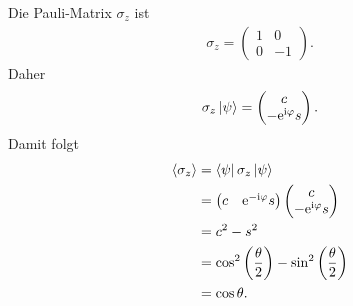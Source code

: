 \documentclass[11pt,a4paper]{scrartcl}
\newcommand{\e}{\mathrm e}
\newcommand{\ii}{\mathrm i}
\begin{document}
\begin{enumerate}[label=(\alph*)]
\begin{calculationbox}
            \begin{calculationbox}[title=Erwartungswert von $\sigma_z$]
                Die Pauli-Matrix $\sigma_z$ ist
                \begin{align*}
                    \sigma_z=
                    \begin{pmatrix}
                        1&0\\
                        0&-1
                    \end{pmatrix}.
                \end{align*}
                Daher
                \begin{align*}
                    \sigma_z\ket{\psi}
                    =
                    \begin{pmatrix}
                        c\\
                        -\e^{\ii\varphi}s
                    \end{pmatrix}.
                \end{align*}
                Damit folgt
                \begin{align*}
                    \braket{\sigma_z}
                    &=
                    \bra{\psi}\sigma_z\ket{\psi}\\
                    &=
                    \begin{pmatrix}
                        c & \e^{-\ii\varphi}s
                    \end{pmatrix}
                    \begin{pmatrix}
                        c\\
                        -\e^{\ii\varphi}s
                    \end{pmatrix}\\
                    &=
                    c^2-s^2\\
                    &=
                    \cos^2\left(\frac{\theta}{2}\right)
                    -
                    \sin^2\left(\frac{\theta}{2}\right)\\
                    &=
                    \cos\theta.
                \end{align*}
            \end{calculationbox}


\end{calculationbox}
\end{enumerate}
\end{document}
